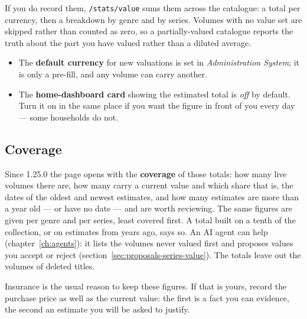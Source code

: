 If you do record them, \texttt{/stats/value} sums them
across the catalogue: a total per currency, then a breakdown by genre
and by series. Volumes with no value set are skipped rather than
counted as zero, so a partially-valued catalogue reports the truth
about the part you have valued rather than a diluted average.

\begin{itemize}
  \item The \textbf{default currency} for new valuations is set in
        \emph{Administration \textrightarrow{} System}; it is only a
        pre-fill, and any volume can carry another.
  \item The \textbf{home-dashboard card} showing the estimated total is
        \emph{off} by default. Turn it on in the same place if you want
        the figure in front of you every day --- some households do not.
\end{itemize}

\subsection*{Coverage}

Since 1.25.0 the page opens with the \textbf{coverage} of those totals:
how many live volumes there are, how many carry a current value and
which share that is, the dates of the oldest and newest estimates, and
how many estimates are more than a year old --- or have no date --- and
are worth reviewing. The same figures are given per genre and per
series, least covered first. A total built on a tenth of the
collection, or on estimates from years ago, says so. An AI agent can
help (chapter~\ref{ch:agents}): it lists the volumes never valued
first and proposes values you accept or reject
(section~\ref{sec:proposals-series-value}). The totals leave out the
volumes of deleted titles.

\begin{note}
Insurance is the usual reason to keep these figures. If that is yours,
record the purchase price as well as the current value: the first is a
fact you can evidence, the second an estimate you will be asked to
justify.
\end{note}

